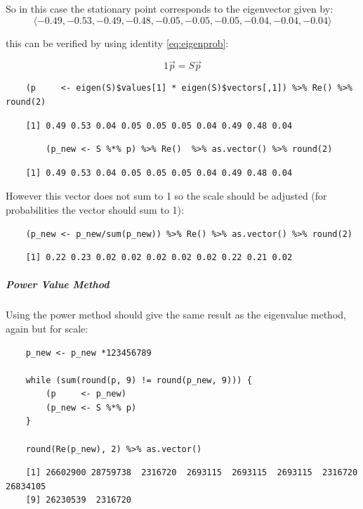 \documentclass[11pt]{report}
\begin{document}
So in this case the stationary point corresponds to the eigenvector given by:
\[
\langle -0.49, -0.53, -0.49, -0.48, -0.05, -0.05, -0.05, -0.04, -0.04, -0.04 \rangle
\]

this can be verified by using identity \eqref{eq:eigenprob}:

$$
1 \vec{p} = S\vec{p}
$$

\begin{tcolorbox}
    \begin{verbatim}
    (p     <- eigen(S)$values[1] * eigen(S)$vectors[,1]) %>% Re() %>%  round(2)
    \end{verbatim}
\tcblower
    \begin{verbatim}
    [1] 0.49 0.53 0.04 0.05 0.05 0.05 0.04 0.49 0.48 0.04
    \end{verbatim}
\end{tcolorbox}

\begin{tcolorbox}
    \begin{verbatim}
        (p_new <- S %*% p) %>% Re()  %>% as.vector() %>% round(2)
    \end{verbatim}
 \tcblower
    \begin{verbatim}
    [1] 0.49 0.53 0.04 0.05 0.05 0.05 0.04 0.49 0.48 0.04
    \end{verbatim}
\end{tcolorbox}


However this vector does not sum to 1 so the scale should be adjusted
(for probabilities the vector should sum to 1):

\begin{tcolorbox}
    \begin{verbatim}
    (p_new <- p_new/sum(p_new)) %>% Re() %>% as.vector() %>% round(2)
    \end{verbatim}
\tcblower
    \begin{verbatim}
    [1] 0.22 0.23 0.02 0.02 0.02 0.02 0.02 0.22 0.21 0.02
    \end{verbatim}
\end{tcolorbox}

\subparagraph{Power Value Method}
\label{power-value-method}
Using the power method should give the same result as the eigenvalue method, again but for scale:

\begin{tcolorbox}
    \begin{verbatim}
    p_new <- p_new *123456789

    while (sum(round(p, 9) != round(p_new, 9))) {
        (p     <- p_new)
        (p_new <- S %*% p)
    }

    round(Re(p_new), 2) %>% as.vector()
    \end{verbatim}
\tcblower
    \begin{verbatim}
    [1] 26602900 28759738  2316720  2693115  2693115  2693115  2316720 26834105
    [9] 26230539  2316720
    \end{verbatim}
\end{tcolorbox}
\end{document}
